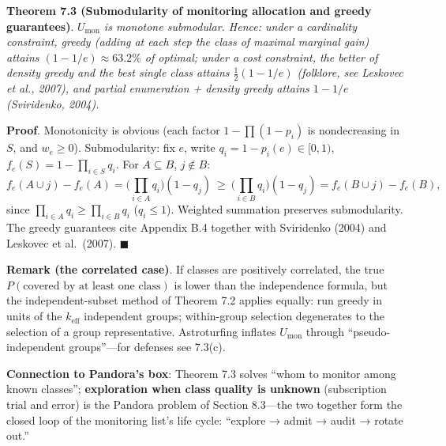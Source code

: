 \documentclass[
  11pt]{article}
\begin{document}
\textbf{Theorem 7.3 (Submodularity of monitoring allocation and greedy
guarantees)}. \emph{\(U_{\mathrm{mon}}\) is monotone submodular. Hence:
under a cardinality constraint, greedy (adding at each step the class of
maximal marginal gain) attains \((1-1/e) \approx 63.2\%\) of optimal;
under a cost constraint, the better of density greedy and the best
single class attains \(\frac12(1-1/e)\) (folklore, see Leskovec et al.,
2007), and partial enumeration + density greedy attains \(1-1/e\)
(Sviridenko, 2004).}

\textbf{Proof}. Monotonicity is obvious (each factor
\(1 - \prod(1-p_i)\) is nondecreasing in \(S\), and \(w_e \ge 0\)).
Submodularity: fix \(e\), write \(q_i = 1 - p_i(e) \in [0,1)\),
\(f_e(S) = 1 - \prod_{i\in S} q_i\). For \(A \subseteq B\),
\(j \notin B\):
\[f_e(A \cup j) - f_e(A) = \Big(\prod_{i\in A} q_i\Big)(1 - q_j) \ \ge\ \Big(\prod_{i\in B} q_i\Big)(1 - q_j) = f_e(B \cup j) - f_e(B),\]
since \(\prod_{i\in A} q_i \ge \prod_{i\in B} q_i\) (\(q_i \le 1\)).
Weighted summation preserves submodularity. The greedy guarantees cite
Appendix B.4 together with Sviridenko (2004) and Leskovec et al.~(2007).
\(\blacksquare\)

\textbf{Remark (the correlated case)}. If classes are positively
correlated, the true \(P(\text{covered by at least one class})\) is
lower than the independence formula, but the independent-subset method
of Theorem 7.2 applies equally: run greedy in units of the
\(k_{\mathrm{eff}}\) independent groups; within-group selection
degenerates to the selection of a group representative. Astroturfing
inflates \(U_{\mathrm{mon}}\) through ``pseudo-independent
groups''---for defenses see 7.3(c).

\textbf{Connection to Pandora's box}: Theorem 7.3 solves ``whom to
monitor among known classes''; \textbf{exploration when class quality is
unknown} (subscription trial and error) is the Pandora problem of
Section 8.3---the two together form the closed loop of the monitoring
list's life cycle: ``explore → admit → audit → rotate out.''
\end{document}
